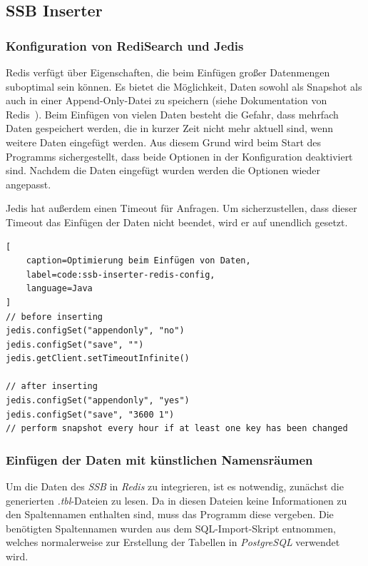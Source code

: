 \subsection{SSB Inserter}\label{sec:ssb-inserter}

\subsubsection{Konfiguration von RediSearch und Jedis}
Redis verfügt über Eigenschaften, die beim Einfügen großer Datenmengen suboptimal sein können.
Es bietet die Möglichkeit, Daten sowohl als Snapshot als auch in einer Append-Only-Datei zu speichern (siehe Dokumentation von Redis~\cite{redis_ltd_persistence_nodate}).
Beim Einfügen von vielen Daten besteht die Gefahr, dass mehrfach Daten gespeichert werden, die in kurzer Zeit nicht mehr aktuell sind, wenn weitere Daten eingefügt werden. Aus diesem Grund wird beim Start des Programms sichergestellt, dass beide Optionen in der Konfiguration deaktiviert sind. Nachdem die Daten eingefügt wurden werden die Optionen wieder angepasst. 

Jedis hat außerdem einen Timeout für Anfragen. Um sicherzustellen, dass dieser Timeout das Einfügen der Daten nicht beendet, wird er auf unendlich gesetzt.

\begin{lstlisting}[
    caption=Optimierung beim Einfügen von Daten,
    label=code:ssb-inserter-redis-config,
    language=Java
]
// before inserting
jedis.configSet("appendonly", "no")
jedis.configSet("save", "")
jedis.getClient.setTimeoutInfinite()

// after inserting
jedis.configSet("appendonly", "yes")
jedis.configSet("save", "3600 1")
// perform snapshot every hour if at least one key has been changed
\end{lstlisting}


\subsubsection{Einfügen der Daten mit künstlichen Namensräumen}
Um die Daten des \emph{SSB} in \emph{Redis} zu integrieren, ist es notwendig, zunächst die generierten \emph{.tbl}-Dateien zu lesen. Da in diesen Dateien keine Informationen zu den Spaltennamen enthalten sind, muss das Programm diese vergeben. Die benötigten Spaltennamen wurden aus dem SQL-Import-Skript entnommen, welches normalerweise zur Erstellung der Tabellen in \emph{PostgreSQL} verwendet wird.

